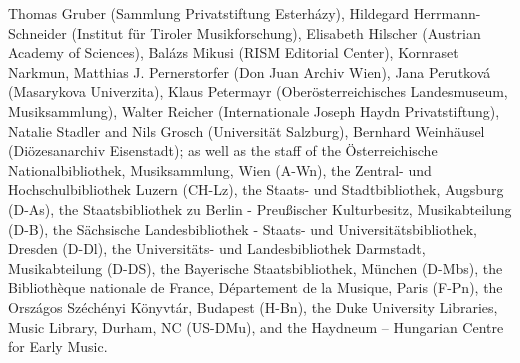 \documentclass{ees}
\begin{document}
Thomas Gruber (Sammlung Privatstiftung Esterházy),
Hildegard Herrmann-Schneider (Institut für Tiroler Musikforschung),
Elisabeth Hilscher (Austrian Academy of Sciences),
Balázs Mikusi (RISM Editorial Center),
Kornraset Narkmun,
Matthias J. Pernerstorfer (Don Juan Archiv Wien),
Jana Perutková (Masarykova Univerzita),
Klaus Petermayr (Oberösterreichisches Landesmuseum, Musiksammlung),
Walter Reicher (Internationale Joseph Haydn Privatstiftung),
Natalie Stadler and Nils Grosch (Universität Salzburg),
Bernhard Weinhäusel (Diözesanarchiv Eisenstadt);
as well as the staff of
the Österreichische Nationalbibliothek, Musiksammlung, Wien (A-Wn),
the Zentral- und Hochschulbibliothek Luzern (CH-Lz),
the Staats- und Stadtbibliothek, Augsburg (D-As),
the Staatsbibliothek zu Berlin - Preußischer Kulturbesitz, Musikabteilung (D-B),
the Sächsische Landesbibliothek - Staats- und Universitätsbibliothek, Dresden (D-Dl),
the Universitäts- und Landesbibliothek Darmstadt, Musikabteilung (D-DS),
the Bayerische Staatsbibliothek, München (D-Mbs),
the Bibliothèque nationale de France, Département de la Musique, Paris (F-Pn),
the Országos Széchényi Könyvtár, Budapest (H-Bn),
the Duke University Libraries, Music Library, Durham, NC (US-DMu),
and the Haydneum – Hungarian Centre for Early Music.


\clearpage
{}
\end{document}

